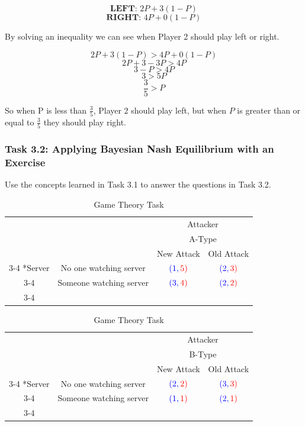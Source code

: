 \documentclass[letterpaper,12pt]{report}
\begin{document}
$$\textbf{LEFT: } 2P + 3(1-P)$$
$$\textbf{RIGHT: }  4P + 0(1-P)$$

By solving an inequality we can see when Player 2 should play left or right.

$$ 2P + 3(1-P) > 4P + 0(1-P) $$
$$ 2P + 3 - 3P  > 4P $$
$$ 3 - P > 4P $$
$$ 3 > 5P $$
$$ \frac{3}{5} > P $$

So when P is less than $\frac{3}{5}$, Player 2 should play left, but when $P$ is greater than or equal to $\frac{3}{5}$ they should play right.

\subsubsection*{Task 3.2: Applying Bayesian Nash Equilibrium with an Exercise}\label{sec:Task-3.2-Applying-Bayesian-Nash-Equilibrium-With-an-Exercise}

Use the concepts learned in Task 3.1 to answer the questions in Task 3.2.

\begin{table}[ht]
    \setlength{\extrarowheight}{2pt}
    \begin{tabular}{cc|c|c|}
      & \multicolumn{1}{c}{} & \multicolumn{2}{c}{\color{red}Attacker}\\
      & \multicolumn{1}{c}{} & \multicolumn{2}{c}{\color{red}A-Type}\\
      & \multicolumn{1}{c}{} & \multicolumn{1}{c}{\color{red}New Attack}  & \multicolumn{1}{c}{\color{red}Old Attack} \\\cline{3-4}
      \multirow{2}*{\color{blue}Server}  & \color{blue}No one watching server & $\color{blue}(1,\color{red}5)$ & $\color{blue}(2,\color{red}3)$ \\\cline{3-4}
      & \color{blue}Someone watching server & $\color{blue}(3,\color{red}4)$ & $\color{blue}(2,\color{red}2)$ \\\cline{3-4}
    \end{tabular}
    \begin{tabular}{cc|c|c|}
      & \multicolumn{1}{c}{} & \multicolumn{2}{c}{\color{red}Attacker}\\
      & \multicolumn{1}{c}{} & \multicolumn{2}{c}{\color{red}B-Type}\\
      & \multicolumn{1}{c}{} & \multicolumn{1}{c}{\color{red}New Attack}  & \multicolumn{1}{c}{\color{red}Old Attack} \\\cline{3-4}
      \multirow{2}*{\color{blue}Server}  & \color{blue}No one watching server & $\color{blue}(2,\color{red}2)$ & $\color{blue}(3,\color{red}3)$ \\\cline{3-4}
      &\color{blue}Someone watching server & $\color{blue}(1,\color{red}1)$ & $\color{blue}(2,\color{red}1)$ \\\cline{3-4}
    \end{tabular}
\caption{Game Theory Task}
\label{Tab:game_theory_3}
\end{table}
\end{document}
